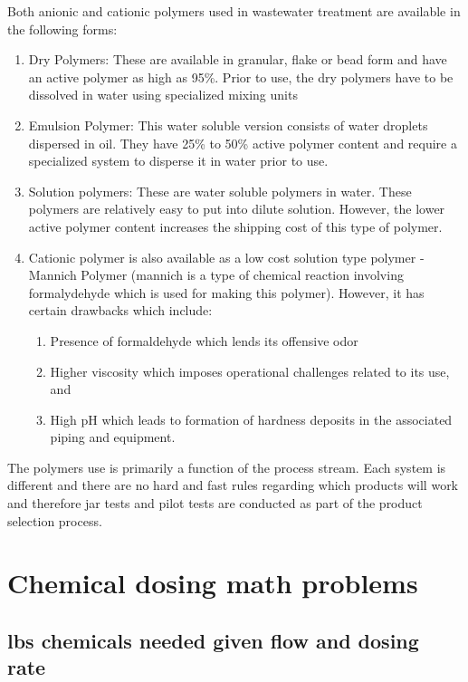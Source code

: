 \vspace{0.6cm}
Both anionic and cationic polymers used in wastewater treatment are available in the following forms: 
\begin{enumerate}
\item Dry Polymers:  These are available in granular, flake or bead form and have an active polymer as high as 95\%.  Prior to use, the dry polymers have to be dissolved in water using specialized mixing units 
\item Emulsion Polymer:  This water soluble version consists of water droplets dispersed in oil.  They have 25\% to 50\% active polymer content and require a specialized system to disperse it in water prior to use.
\item Solution polymers:  These are water soluble polymers in water. These polymers are relatively easy to put into dilute solution.  However, the lower active polymer content increases the shipping cost of this type of polymer.
\item Cationic polymer is also available as a low cost solution type polymer - Mannich Polymer (mannich is a type of chemical reaction involving formalydehyde which is used for making this polymer).  However, it has certain drawbacks which include: 
\begin{enumerate}
\item Presence of formaldehyde which lends its offensive odor
\item Higher viscosity which imposes operational challenges related to its use, and
\item High pH which leads to formation of hardness deposits in the associated piping and equipment.
\end{enumerate}
\end{enumerate}

The polymers use is primarily a function of the process stream.  Each system is different and there are no hard and fast rules regarding which products will work and therefore jar tests and pilot tests are conducted as part of the product selection process.\\

\section{Chemical dosing math problems}
\subsection{lbs chemicals needed given flow and dosing rate}

